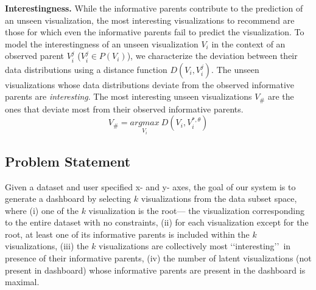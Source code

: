 \textbf{Interestingness.} While the informative parents contribute to the prediction of an unseen visualization, the most interesting visualizations to recommend are those for which even the informative parents fail to predict the visualization. To model the interestingness of an unseen visualization $V_i$ in the context of an observed parent $V_i^j$ ($V_i^j \in P(V_i)$), we characterize the deviation between their data distributions using a distance function $D(V_i, V_i^j)$. The unseen visualizations whose data distributions deviate from the observed informative parents are \emph{interesting}. The most interesting unseen visualizations $V_\#$ are the ones that deviate most from their observed informative parents.
\begin{equation}
    V_\#=\underset{V_i}{argmax} \ D(V_i, V_i^{*, \theta})
\end{equation}


\subsection{Problem Statement}

Given a dataset and user specified x- and y- axes, the goal of our system is to generate a dashboard by selecting $k$ visualizations from the data subset space, where (i) one of the $k$ visualization is the root--- the visualization corresponding to the entire dataset with no constraints, (ii) for each visualization except for the root, at least one of its informative parents is included within the $k$ visualizations, (iii) the $k$ visualizations are collectively most \lq\lq interesting\rq\rq\ in presence of their informative parents, (iv) the number of latent visualizations (not present in dashboard) whose informative parents are present in the dashboard is maximal.

